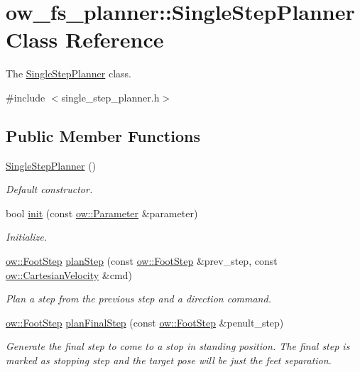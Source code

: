 \hypertarget{classow__fs__planner_1_1SingleStepPlanner}{}\section{ow\+\_\+fs\+\_\+planner\+:\+:Single\+Step\+Planner Class Reference}
\label{classow__fs__planner_1_1SingleStepPlanner}


The \hyperlink{classow__fs__planner_1_1SingleStepPlanner}{Single\+Step\+Planner} class.  




{\ttfamily \#include $<$single\+\_\+step\+\_\+planner.\+h$>$}

\subsection*{Public Member Functions}
\begin{DoxyCompactItemize}
\item 
\hyperlink{classow__fs__planner_1_1SingleStepPlanner_a876d81e2da34a904087e1b5a54345de1}{Single\+Step\+Planner} ()
\begin{DoxyCompactList}\small\item\em Default constructor. \end{DoxyCompactList}\item 
bool \hyperlink{classow__fs__planner_1_1SingleStepPlanner_ab207c6884fa0c8a266bf6434725da77b}{init} (const \hyperlink{classow_1_1Parameter}{ow\+::\+Parameter} \&parameter)\hypertarget{classow__fs__planner_1_1SingleStepPlanner_ab207c6884fa0c8a266bf6434725da77b}{}\label{classow__fs__planner_1_1SingleStepPlanner_ab207c6884fa0c8a266bf6434725da77b}

\begin{DoxyCompactList}\small\item\em Initialize. \end{DoxyCompactList}\item 
\hyperlink{classow__core_1_1FootStep}{ow\+::\+Foot\+Step} \hyperlink{classow__fs__planner_1_1SingleStepPlanner_aa65a57bf7c19ff6549d534bf4d347b14}{plan\+Step} (const \hyperlink{classow__core_1_1FootStep}{ow\+::\+Foot\+Step} \&prev\+\_\+step, const \hyperlink{classow__core_1_1CartesianVelocity}{ow\+::\+Cartesian\+Velocity} \&cmd)
\begin{DoxyCompactList}\small\item\em Plan a step from the previous step and a direction command. \end{DoxyCompactList}\item 
\hyperlink{classow__core_1_1FootStep}{ow\+::\+Foot\+Step} \hyperlink{classow__fs__planner_1_1SingleStepPlanner_aeeb58211a0a2486e1293480019b13803}{plan\+Final\+Step} (const \hyperlink{classow__core_1_1FootStep}{ow\+::\+Foot\+Step} \&penult\+\_\+step)
\begin{DoxyCompactList}\small\item\em Generate the final step to come to a stop in standing position. The final step is marked as stopping step and the target pose will be just the feet separation. \end{DoxyCompactList}\end{DoxyCompactItemize}

